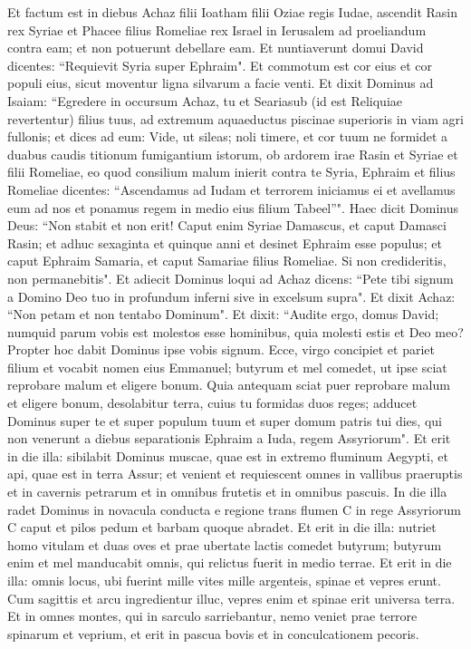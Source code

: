 \begin{biblechapter}  
\verse Et factum est in diebus Achaz filii Ioatham filii Oziae regis Iudae, ascendit Rasin rex Syriae et Phacee filius Romeliae rex Israel in Ierusalem ad proeliandum contra eam; et non potuerunt debellare eam. 
\verse Et nuntiaverunt domui David dicentes: “Requievit Syria super Ephraim". Et commotum est cor eius et cor populi eius, sicut moventur ligna silvarum a facie venti. 
\verse Et dixit Dominus ad Isaiam: “Egredere in occursum Achaz, tu et Seariasub (id est Reliquiae revertentur) filius tuus, ad extremum aquaeductus piscinae superioris in viam agri fullonis; 
\verse et dices ad eum: Vide, ut sileas; noli timere, et cor tuum ne formidet a duabus caudis titionum fumigantium istorum, ob ardorem irae Rasin et Syriae et filii Romeliae, 
\verse eo quod consilium malum inierit contra te Syria, Ephraim et filius Romeliae dicentes: 
\verse “Ascendamus ad Iudam et terrorem iniciamus ei et avellamus eum ad nos et ponamus regem in medio eius filium Tabeel”". 
\verse Haec dicit Dominus Deus: “Non stabit et non erit! 
\verse Caput enim Syriae Damascus, et caput Damasci Rasin; et adhuc sexaginta et quinque anni et desinet Ephraim esse populus; 
\verse et caput Ephraim Samaria, et caput Samariae filius Romeliae. Si non credideritis, non permanebitis". 
\verse Et adiecit Dominus loqui ad Achaz dicens: 
\verse “Pete tibi signum a Domino Deo tuo in profundum inferni sive in excelsum supra". 
\verse Et dixit Achaz: “Non petam et non tentabo Dominum". 
\verse Et dixit: “Audite ergo, domus David; numquid parum vobis est molestos esse hominibus, quia molesti estis et Deo meo? 
\verse Propter hoc dabit Dominus ipse vobis signum. Ecce, virgo concipiet et pariet filium et vocabit nomen eius Emmanuel; 
\verse butyrum et mel comedet, ut ipse sciat reprobare malum et eligere bonum. 
\verse Quia antequam sciat puer reprobare malum et eligere bonum, desolabitur terra, cuius tu formidas duos reges; 
\verse adducet Dominus super te et super populum tuum et super domum patris tui dies, qui non venerunt a diebus separationis Ephraim a Iuda, regem Assyriorum". 
\verse Et erit in die illa: sibilabit Dominus muscae, quae est in extremo fluminum Aegypti, et api, quae est in terra Assur; 
\verse et venient et requiescent omnes in vallibus praeruptis et in cavernis petrarum et in omnibus frutetis et in omnibus pascuis. 
\verse In die illa radet Dominus in novacula conducta e regione trans flumen C in rege Assyriorum C caput et pilos pedum et barbam quoque abradet. 
\verse Et erit in die illa: nutriet homo vitulam et duas oves 
\verse et prae ubertate lactis comedet butyrum; butyrum enim et mel manducabit omnis, qui relictus fuerit in medio terrae. 
\verse Et erit in die illa: omnis locus, ubi fuerint mille vites mille argenteis, spinae et vepres erunt. 
\verse Cum sagittis et arcu ingredientur illuc, vepres enim et spinae erit universa terra. 
\verse Et in omnes montes, qui in sarculo sarriebantur, nemo veniet prae terrore spinarum et veprium, et erit in pascua bovis et in conculcationem pecoris. 
\end{biblechapter}

